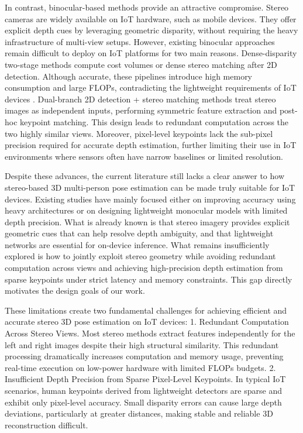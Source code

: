 \documentclass[journal]{IEEEtran}
\begin{document}
In contrast, binocular-based methods provide an attractive compromise. Stereo cameras are widely available on IoT hardware, such as mobile devices. They offer explicit depth cues by leveraging geometric disparity, without requiring the heavy infrastructure of multi-view setups. However, existing binocular approaches remain difficult to deploy on IoT platforms for two main reasons.
Dense-disparity two-stage methods  compute cost volumes or dense stereo matching after 2D detection. Although accurate, these pipelines introduce high memory consumption and large FLOPs, contradicting the lightweight requirements of IoT devices . Dual-branch 2D detection + stereo matching methods  treat stereo images as independent inputs, performing symmetric feature extraction and post-hoc keypoint matching. This design leads to redundant computation across the two highly similar views. Moreover, pixel-level keypoints lack the sub-pixel precision required for accurate depth estimation, further limiting their use in IoT environments where sensors often have narrow baselines or limited resolution.

Despite these advances, the current literature still lacks a clear answer to how stereo-based 3D multi-person pose estimation can be made truly suitable for IoT devices. Existing studies have mainly focused either on improving accuracy using heavy architectures or on designing lightweight monocular models with limited depth precision. What is already known is that stereo imagery provides explicit geometric cues that can help resolve depth ambiguity, and that lightweight networks are essential for on-device inference. What remains insufficiently explored is how to jointly exploit stereo geometry while avoiding redundant computation across views and achieving high-precision depth estimation from sparse keypoints under strict latency and memory constraints. This gap directly motivates the design goals of our work.

These limitations create two fundamental challenges for achieving efficient and accurate stereo 3D pose estimation on IoT devices: 1. Redundant Computation Across Stereo Views. Most stereo methods extract features independently for the left and right images despite their high structural similarity. This redundant processing dramatically increases computation and memory usage, preventing real-time execution on low-power hardware with limited FLOPs budgets. 2. Insufficient Depth Precision from Sparse Pixel-Level Keypoints. In typical IoT scenarios, human keypoints derived from lightweight detectors are sparse and exhibit only pixel-level accuracy. Small disparity errors can cause large depth deviations, particularly at greater distances, making stable and reliable 3D reconstruction difficult.
\end{document}
